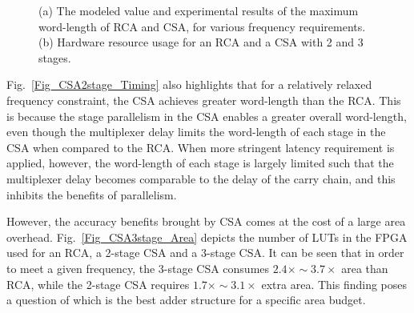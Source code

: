 \documentclass[prodmode,acmtrets]{acmsmall} %
\begin{document}
\begin{figure}[t]
    \vspace{-3ex}
    \vspace{-2ex}
    \caption{(a) The modeled value and experimental results of the maximum word-length of RCA and CSA, for various frequency requirements. (b) Hardware resource usage for an RCA and a CSA with 2 and 3 stages.}
    \vspace{-1ex}
\end{figure}

Fig.~\ref{Fig_CSA2stage_Timing} also highlights that for a relatively relaxed frequency constraint, the CSA achieves greater word-length than the RCA. This is because the stage parallelism in the CSA enables a greater overall word-length, even though the multiplexer delay limits the word-length of each stage in the CSA when compared to the RCA. When more stringent latency requirement is applied, however, the word-length of each stage is largely limited such that the multiplexer delay becomes comparable to the delay of the carry chain, and this inhibits the benefits of parallelism.

However, the accuracy benefits brought by CSA comes at the cost of a large area overhead. Fig.~\ref{Fig_CSA3stage_Area} depicts the number of LUTs in the FPGA used for an RCA, a 2-stage CSA and a 3-stage CSA. It can be seen that in order to meet a given frequency, the 3-stage CSA consumes $2.4\times\sim3.7\times$ area than RCA, while the 2-stage CSA requires $1.7\times\sim3.1\times$ extra area. This finding poses a question of which is the best adder structure for a specific area budget.
\end{document}
